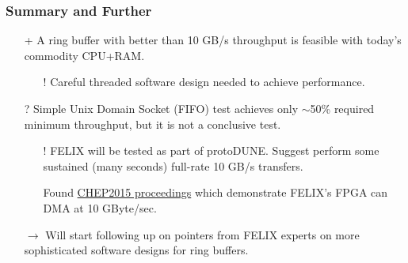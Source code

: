 \documentclass[xcolor=dvipsnames]{beamer}
\begin{document}
\begin{frame}
  \frametitle{Summary and Further}
  \begin{itemize}
  \item[+] A ring buffer with better than 10 GB/s throughput is feasible
    with today's commodity CPU+RAM.
    \begin{itemize}\footnotesize
    \item[!] Careful threaded software design needed to achieve performance.
    \end{itemize}
  \item[?] Simple Unix Domain Socket (FIFO) test achieves only $\sim$50\%
    required minimum throughput,  but it is not a conclusive test.
    \begin{itemize}\footnotesize
    \item[!] FELIX will be tested as part of protoDUNE.  Suggest perform
      some sustained (many seconds) full-rate 10 GB/s transfers.
    \item[\checkmark] Found \href{http://iopscience.iop.org/article/10.1088/1742-6596/664/8/082050}{CHEP2015 proceedings} which demonstrate FELIX's FPGA can DMA at 10 GByte/sec.
    \end{itemize}
  \item[$\to$] Will start following up on pointers from FELIX experts on more
    sophisticated software designs for ring buffers.
  \end{itemize}
\end{frame}
\end{document}
